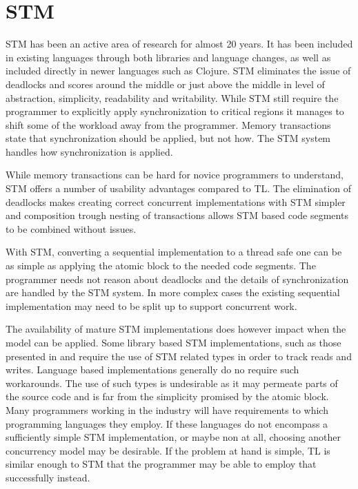 
\section{\acl{STM}}\label{sec:choose_STM}
\ac{STM} has been an active area of research for almost 20 years\cite{shavit1997software}. It has been included in existing languages through both libraries\cite{rossbach2010transactional} and language changes\cite{harris2003language}, as well as included directly in newer languages such as Clojure. \ac{STM} eliminates the issue of deadlocks and scores around the middle or just above the middle in level of abstraction, simplicity, readability and writability. While \ac{STM} still require the programmer to explicitly apply synchronization to critical regions it manages to shift some of the workload away from the programmer. Memory transactions state that synchronization should be applied, but not how. The \ac{STM} system handles how synchronization is applied.

While memory transactions can be hard for novice programmers to understand, \ac{STM} offers a number of usability advantages compared to \ac{TL}. The elimination of deadlocks makes creating correct concurrent implementations with \ac{STM} simpler and composition trough nesting of transactions allows \ac{STM} based code segments to be combined without issues. 

With \ac{STM}, converting a sequential implementation to a thread safe one can be as simple as applying the atomic block to the needed code segments. The programmer needs not reason about deadlocks and the details of synchronization are handled by the \ac{STM} system. In more complex cases the existing sequential implementation may need to be split up to support concurrent work.

The availability of mature \ac{STM} implementations does however impact when the model can be applied. Some library based \ac{STM} implementations, such as those presented in \cite{ramadan2009committing} and \cite{herlihy2006flexible} require the use of \ac{STM} related types in order to track reads and writes. Language based implementations generally do no require such workarounds. The use of such types is undesirable as it may permeate parts of the source code and is far from the simplicity promised by the atomic block. Many programmers working in the industry will have requirements to which programming languages they employ. If these languages do not encompass a sufficiently simple \ac{STM} implementation, or maybe non at all, choosing another concurrency model may be desirable. If the problem at hand is simple, \ac{TL} is similar enough to \ac{STM} that the programmer may be able to employ that successfully instead.


